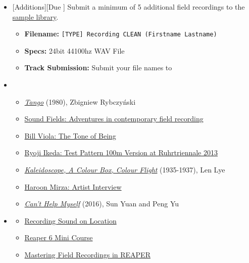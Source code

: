 \begin{itemize}[noitemsep,topsep=0pt,leftmargin=*]
\begin{itemize}
	      \end{itemize}
	\item {}[Additions][Due \dSun] \newline
	      Submit a minimum of 5 additional field recordings to the \href{\samplelibPermURL}{sample library}.
	      \begin{itemize}
		      \item \textbf{Filename:} \texttt{[TYPE] Recording CLEAN (Firstname Lastname)}
		      \item \textbf{Specs:} 24bit 44100hz WAV File
		      \item \textbf{Track Submission:} Submit your file names to \discordS
	      \end{itemize}
	\item {}
	      \begin{itemize}
		      \item \href{https://www.youtube.com/watch?v=u0pEpA_Y1a4}{\emph{Tango}} (1980), Zbigniew Rybczyński
		      \item \href{https://www.youtube.com/watch?v=esfUwg1-xrI}{Sound Fields: Adventures in contemporary field recording}
		      \item \href{https://vimeo.com/64302190}{Bill Viola: The Tone of Being}
		      \item \href{https://www.youtube.com/watch?v=XwjlYpJCBgk}{Ryoji Ikeda: Test Pattern 100m Version at Ruhrtriennale 2013}
		      \item \href{https://www.youtube.com/watch?v=-DksmbDMDUU}{\emph{Kaleidoscope, A Colour Box, Colour Flight}} (1935-1937), Len Lye
		      \item \href{https://www.youtube.com/watch?v=Y8Zpr1ESEO4}{Haroon Mirza: Artist Interview}
		      \item \href{https://www.youtube.com/watch?v=ZS4Bpr2BgnE}{\emph{Can’t Help Myself}} (2016), Sun Yuan and Peng Yu
	      \end{itemize}
	\item {}
	      \begin{resenv}
		      \begin{itemize}
			      \item \href{https://www.youtube.com/watch?v=TKBzjSSaKXU}{Recording Sound on Location}
			      \item \href{https://www.youtube.com/playlist?list=PLM0xHqxaiT6-plorG47t3balft4nVki39}{Reaper 6 Mini Course}
			      \item \href{https://www.youtube.com/watch?v=7BfWqRapF5E}{Mastering Field Recordings in REAPER}
		      \end{itemize}
	      \end{resenv}
\end{itemize}